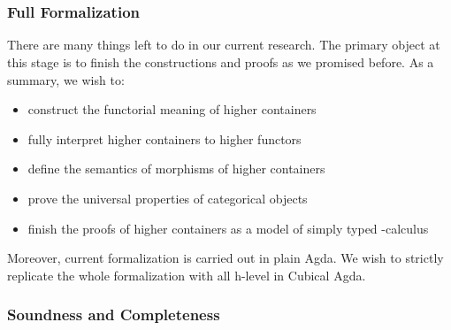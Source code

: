 \begin{code}[hide]
\AgdaSymbol{:}\AgdaSpace{}%
\AgdaSymbol{(}\AgdaSpace{}%
\AgdaSymbol{:}\AgdaSpace{}%
\AgdaSymbol{)}\AgdaSpace{}%
\AgdaSpace{}%
\AgdaSymbol{(}\AgdaSpace{}%
\AgdaSpace{}%
\AgdaSpace{}%
\AgdaSpace{}%
\AgdaSymbol{)}\AgdaSpace{}%
\AgdaSpace{}%
\AgdaSpace{}%
\AgdaSpace{}%
\<%
\\
\>[0]\AgdaSpace{}%
\AgdaSymbol{=}\AgdaSpace{}%
\<%
\\
\>[0]\AgdaSpace{}%
\AgdaSpace{}%
\AgdaSpace{}%
\AgdaSpace{}%
\AgdaSpace{}%
\AgdaSpace{}%
\AgdaSymbol{)}\AgdaSpace{}%
\AgdaSymbol{=}\AgdaSpace{}%
\AgdaFunction{Σtm[}\AgdaSpace{}%
\AgdaSpace{}%
\AgdaSpace{}%
\AgdaSpace{}%
\AgdaFunction{]}\AgdaSpace{}%
\<%
\end{code}

\subsubsection*{Full Formalization}

There are many things left to do in our current research. The primary object at this stage is to finish the constructions and proofs as we promised before. As a summary, we wish to:

\begin{itemize}
  \item{construct the functorial meaning of higher containers}
  \item{fully interpret higher containers to higher functors}
  \item{define the semantics of morphisms of higher containers}
  \item{prove the universal properties of categorical objects}
  \item{finish the proofs of higher containers as a model of simply typed \lambda-calculus}
\end{itemize}

Moreover, current formalization is carried out in plain Agda. We wish to strictly replicate the whole formalization with all h-level in Cubical Agda.

\subsubsection*{Soundness and Completeness}


